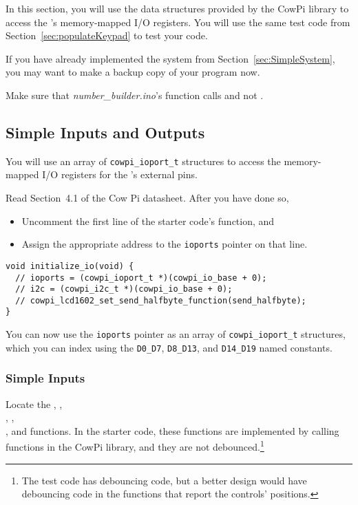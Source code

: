In this section, you will use the data structures provided by the CowPi library to access the \developmentboard's memory-mapped I/O registers.
You will use the same test code from Section~\ref{sec:populateKeypad} to test your code.

If you have already implemented the system from Section~\ref{sec:SimpleSystem}, you may want to make a backup copy of your program now.

Make sure that \textit{number\_builder.ino}'s  function calls  and not .

\subsection{Simple Inputs and Outputs}

You will use an array of \lstinline{cowpi_ioport_t} structures to access the memory-mapped I/O registers for the \developmentboard's external pins.

Read Section~4.1 of the Cow Pi datasheet.
After you have done so,
\begin{itemize}
    \item Uncomment the first line of the starter code's  function, and
    \item Assign the appropriate address to the \lstinline{ioports} pointer on that line.
\end{itemize}

\begin{lstlisting}
void initialize_io(void) {
  // ioports = (cowpi_ioport_t *)(cowpi_io_base + 0);
  // i2c = (cowpi_i2c_t *)(cowpi_io_base + 0);
  // cowpi_lcd1602_set_send_halfbyte_function(send_halfbyte);
}
\end{lstlisting}

You can now use the \lstinline{ioports} pointer as an array of \lstinline{cowpi_ioport_t} structures, which you can index using the \lstinline{D0_D7}, \lstinline{D8_D13}, and \lstinline{D14_D19} named constants.

\subsubsection{Simple Inputs}

Locate the , , \\ , , \\ , and   functions.
In the starter code, these functions are implemented by calling functions in the CowPi library, and they are not debounced.\footnote{
The test code has debouncing code, but a better design would have debouncing code in the functions that report the controls' positions.}

